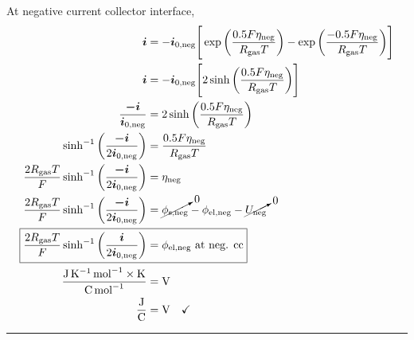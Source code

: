 \documentclass{article}
\begin{document}
At negative current collector interface,
\begin{align}
    \bm{i}                                                                            & = -\bm{i_\text{0,neg}}\Bigg[\exp\bigg(\frac{0.5 F \eta_\text{neg}}{R_\text{gas} T}\bigg) - \exp\bigg(\frac{-0.5 F \eta_\text{neg}}{R_\text{gas} T}\bigg)\Bigg] \\
    \bm{i}                                                                            & = -\bm{i_\text{0,neg}}\Bigg[2 \sinh\bigg(\frac{0.5 F \eta_\text{neg}}{R_\text{gas} T}\bigg) \Bigg]                                                             \\
    \frac{\bm{-i}}{\bm{i_\text{0,neg}}}                                                    & = 2 \sinh\bigg(\frac{0.5 F \eta_\text{neg}}{R_\text{gas} T}\bigg)                                                                                         \\
    \sinh^{-1}\bigg(\frac{\bm{-i}}{2 \bm{i_\text{0,neg}}}\bigg)                            & = \frac{0.5 F \eta_\text{neg}}{R_\text{gas} T}                                                                                                            \\
    \frac{2 R_\text{gas} T}{F} \sinh^{-1}\bigg(\frac{\bm{-i}}{2 \bm{i_\text{0,neg}}}\bigg) & = \eta_\text{neg}                                                                                                                                         \\
    \frac{2 R_\text{gas} T}{F} \sinh^{-1}\bigg(\frac{\bm{-i}}{2 \bm{i_\text{0,neg}}}\bigg) & = \cancelto{0}{\phi_\text{s,neg}} - \phi_\text{el,neg} - \cancelto{0}{U_\text{neg}}                                                                       \\
    \Aboxed{\frac{2 R_\text{gas} T}{F} \sinh^{-1}\bigg(\frac{\bm{i}}{2 \bm{i_\text{0,neg}}}\bigg)  & = \phi_\text{el,neg} \text{ at neg. cc}} \\
    \frac{\si{\joule \per \kelvin \per \mole} \times \si{\kelvin}}{\si{\coulomb\per\mole}} & = \si{\volt} \\
    \frac{\si{\joule}  }{\si{\coulomb}}& = \si{\volt} \quad \checkmark \label{eq:phielnegcc_dimcheck}
\end{align}

\medskip
\hrule
\end{document}

